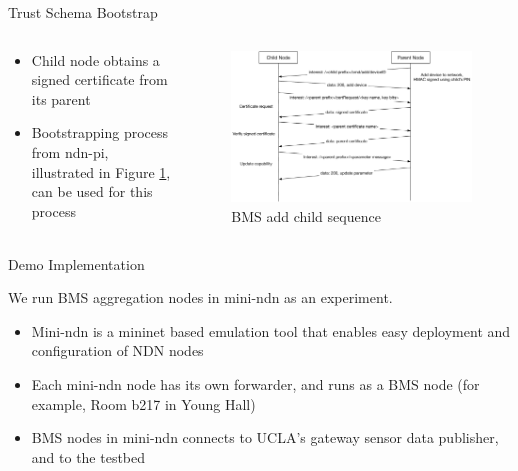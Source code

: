 \documentclass[final,hyperref={pdfpagelabels=false},20pt]{beamer}
\begin{document}
\begin{frame}[t]
\begin{columns}[t]
\begin{column}{.465\textwidth}
\begin{block}{Trust Schema}
Bootstrap

\begin{columns}[T]

\begin{column}{.35\textwidth}

\begin{itemize}
\item{Child node obtains a signed certificate from its parent}
\item{Bootstrapping process from ndn-pi, illustrated in Figure \ref{fig:add-child-sequence}, can be used for this process}
\end{itemize}
\end{column}

\begin{column}{.65\textwidth}
\begin{figure}
\includegraphics[width=\linewidth]{bms-add-child-sequence}
\caption{BMS add child sequence}
\label{fig:add-child-sequence}
\end{figure}
\end{column}

\end{columns}

\end{block}


\begin{block}{Demo Implementation}

We run BMS aggregation nodes in mini-ndn as an experiment.

\begin{itemize}
\item{Mini-ndn is a mininet based emulation tool that enables easy deployment and configuration of NDN nodes \cite{minindn-github}}
\item{Each mini-ndn node has its own forwarder, and runs as a BMS node (for example, Room b217 in Young Hall)}
\item{BMS nodes in mini-ndn connects to UCLA's gateway sensor data publisher, and to the testbed}
\end{itemize}


\end{block}
\end{column}
\end{columns}
\end{frame}
\end{document}
